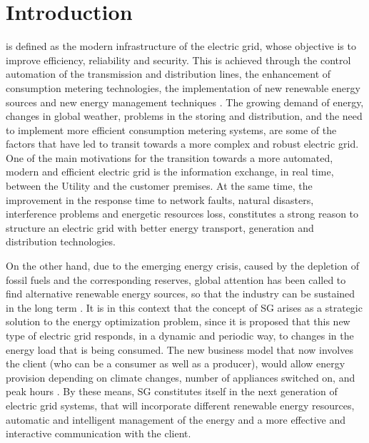 \documentclass[11pt,final,onecolumn]{IEEEtran}
\begin{document}
\section{Introduction}
 is defined as the modern infrastructure of the electric grid, whose objective is to improve efficiency, reliability and security. This is achieved through the control automation of the transmission and distribution lines, the enhancement of consumption metering technologies, the implementation of new renewable energy sources and new energy management techniques \cite{Gungor2011}. The growing demand of energy, changes in global weather, problems in the storing and distribution, and the need to implement more efficient consumption metering systems, are some of the factors that have led to transit towards a more complex and robust electric grid. 
One of the main motivations for the transition towards a more automated, modern and efficient electric grid is the information exchange, in real time, between the Utility and the customer premises. At the same time, the improvement in the response time to network faults, natural disasters, interference problems and energetic resources loss, constitutes a strong reason to structure an electric grid with better energy transport, generation and distribution technologies.

On the other hand, due to the emerging energy crisis, caused by the depletion of fossil fuels and the corresponding reserves, global attention has been called to find alternative renewable energy sources, so that the industry can be sustained in the long term \cite{Wang2011a}. It is in this context that the concept of SG arises as a strategic solution to the energy optimization problem, since it is proposed that this new type of electric grid responds, in a dynamic and periodic way, to changes in the energy load that is being consumed. The new business model that now involves the client (who can be a consumer as well as a producer), would allow energy provision depending on climate changes, number of appliances switched on, and peak hours \cite{Castellani2012}. By these means, SG constitutes itself in the next generation of electric grid systems, that will incorporate different renewable energy resources, automatic and intelligent management of the energy and a more effective and interactive communication with the client.
\end{document}
